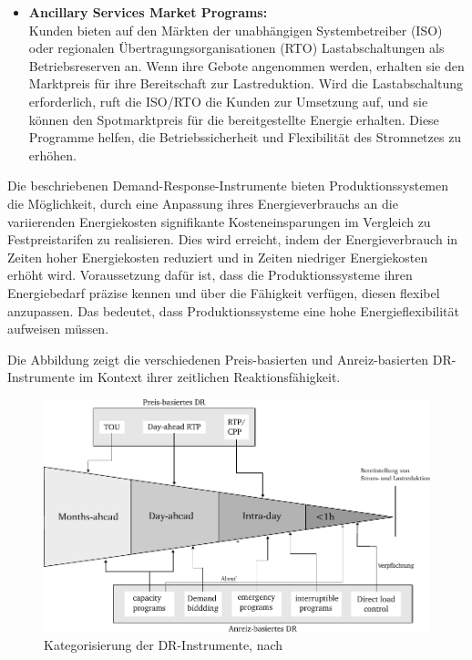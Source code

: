 \begin{itemize}[label={--}]
	\item \textbf{Ancillary Services Market Programs:}\\
	Kunden bieten auf den Märkten der unabhängigen Systembetreiber (ISO) oder regionalen Übertragungsorganisationen (RTO) Lastabschaltungen als Betriebsreserven an. Wenn ihre Gebote angenommen werden, erhalten sie den Marktpreis für ihre Bereitschaft zur Lastreduktion. Wird die Lastabschaltung erforderlich, ruft die ISO/RTO die Kunden zur Umsetzung auf, und sie können den Spotmarktpreis für die bereitgestellte Energie erhalten. Diese Programme helfen, die Betriebssicherheit und Flexibilität des Stromnetzes zu erhöhen.	
\end{itemize}

Die beschriebenen Demand-Response-Instrumente bieten Produktionssystemen die Möglichkeit, durch eine Anpassung ihres Energieverbrauchs an die variierenden Energiekosten signifikante Kosteneinsparungen im Vergleich zu Festpreistarifen zu realisieren. Dies wird erreicht, indem der Energieverbrauch in Zeiten hoher Energiekosten reduziert und in Zeiten niedriger Energiekosten erhöht wird. Voraussetzung dafür ist, dass die Produktionssysteme ihren Energiebedarf präzise kennen und über die Fähigkeit verfügen, diesen flexibel anzupassen. Das bedeutet, dass Produktionssysteme eine hohe Energieflexibilität aufweisen müssen.

Die Abbildung  zeigt die verschiedenen Preis-basierten und Anreiz-basierten DR-Instrumente im Kontext ihrer zeitlichen Reaktionsfähigkeit.

\begin{figure}[h]
	\centering
	\includegraphics[width=400pt]{figures/03_Grundlagen/Kategorisierung der DR-Instrumente.pdf}
	\caption{Kategorisierung der DR-Instrumente, nach \cite{qdrBenefitsDemandResponse2006, grasslEvaluatingMeasuresAdapting2014}}
	\label{fig_03Kategorisierung der DR-Instrumente}
\end{figure}

